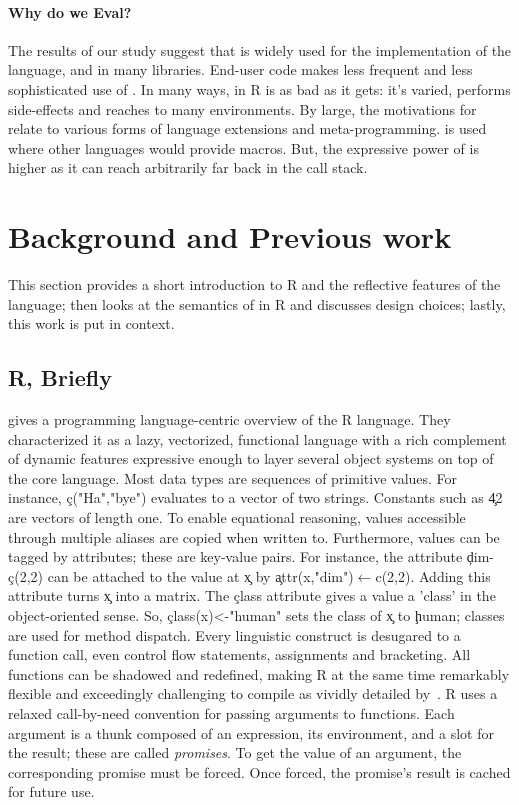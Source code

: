 \documentclass[screen,acmsmall]{acmart}%
\begin{document}
\paragraph{Why do we Eval?} The results of our study suggest
that \eval is widely used for the implementation of the language, and in many
libraries. End-user code makes less frequent and less sophisticated use of
\eval. In many ways, \eval in R is as bad as it gets: it's varied, performs
side-effects and reaches to many environments. By large, the motivations for
\eval relate to various forms of language extensions and meta-programming. \Eval
is used where other languages would provide macros. But, the expressive power of
\eval is higher as it can reach arbitrarily far back in the call stack.


\section{Background and Previous work}

This section provides a short introduction to R and the reflective features of
the language; then looks at the semantics of \eval in R and discusses design
choices; lastly, this work is put in context.

\subsection{R, Briefly}

\citet{ecoop12} gives a programming language-centric overview of the R language.
They characterized it as a lazy, vectorized, functional language with a rich
complement of dynamic features expressive enough to layer several object systems
on top of the core language. Most data types are sequences of primitive values.
For instance, \c{c("Ha","bye")} evaluates to a vector of two strings. Constants
such as \c{42} are vectors of length one. To enable equational reasoning, values
accessible through multiple aliases are copied when written to. Furthermore,
values can be tagged by attributes; these are key-value pairs. For instance, the
attribute \c{dim}-\c{c(2,2)} can be attached to the value at \c{x} by
\c{attr(x,"dim")$\leftarrow$c(2,2)}. Adding this attribute turns \c x into a
matrix. The \c{class} attribute gives a value a 'class' in the object-oriented
sense. So, \c{class(x)<-"human"} sets the class of \c{x} to \c{human}; classes
are used for method dispatch. Every linguistic construct is desugared to a
function call, even control flow statements, assignments and bracketing. All
functions can be shadowed and redefined, making R at the same time remarkably
flexible and exceedingly challenging to compile as vividly detailed
by~\citet{dls19}. R uses a relaxed call-by-need convention for passing arguments
to functions. Each argument is a thunk composed of an expression, its
environment, and a slot for the result; these are called \emph{promises}. To get
the value of an argument, the corresponding promise must be forced. Once forced,
the promise's result is cached for future use.
\end{document}
